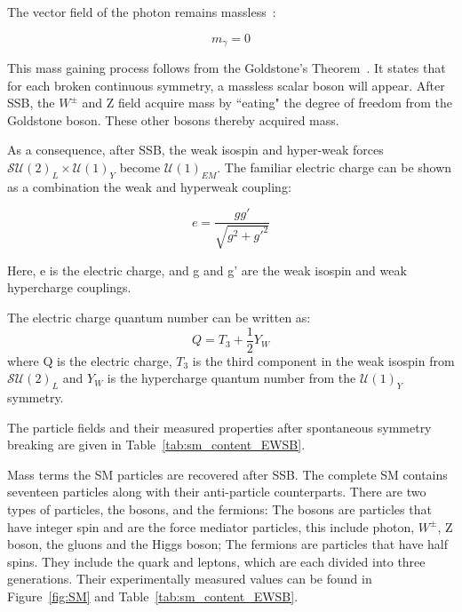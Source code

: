 The vector field of the photon remains massless~\cite{peskin2018introduction}: 

\begin{equation}
    m_{\gamma}=0
\end{equation}


This mass gaining process follows from the Goldstone's Theorem~\cite{PhysRev.117.648}. It states that for each broken continuous symmetry, a massless scalar boson will appear. After SSB, the $W^{\pm}$ and Z field acquire mass by ``eating" the degree of freedom from the Goldstone boson. These other bosons thereby acquired mass. 

As a consequence, after SSB, the weak isospin and hyper-weak forces $\mathcal{SU}(2)_{L} \times \mathcal{U}(1)_{Y}$ become $\mathcal{U}(1)_{EM}$. The familiar electric charge can be shown as a combination the weak and hyperweak coupling:

\begin{equation}
    e= \frac{g g'}{\sqrt{g^{2}+g'^{2}}}
\end{equation}

Here, e is the electric charge, and g and g' are the weak isospin and weak hypercharge couplings. 

The electric charge quantum number can be written as:
\begin{equation}
    Q=T_{3}+\frac{1}{2}Y_{W}
\end{equation}
where Q is the electric charge, $T_{3}$ is the third component in the weak isospin from $\mathcal{SU}(2)_{L}$ and $Y_{W}$ is the hypercharge quantum number from the $\mathcal{U}(1)_{Y}$ symmetry. 

    

The particle fields and their measured properties after spontaneous symmetry breaking are given in Table~\ref{tab:sm_content_EWSB}.

Mass terms the SM particles are recovered after SSB. The complete SM contains seventeen particles along with their anti-particle counterparts. There are two types of particles, the bosons, and the fermions: The bosons are particles that have integer spin and are the force mediator particles, this include photon, $W^{\pm}$, Z boson, the gluons and the Higgs boson; The fermions are particles that have half spins.
They include the quark and leptons, which are each divided into three generations. Their experimentally measured values can be found in Figure~\ref{fig:SM} and Table~\ref{tab:sm_content_EWSB}.

